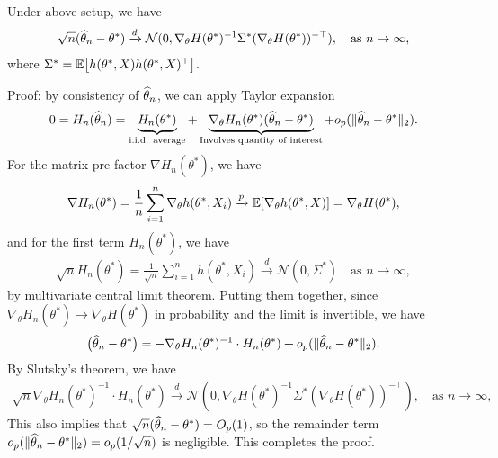 \documentclass[11pt,letterpaper]{article}
\numberwithin{assumption}{lecture}
\numberwithin{theorem}{lecture}
\numberwithin{proposition}{lecture}
\numberwithin{lemma}{lecture}
\numberwithin{claim}{lecture}
\numberwithin{corollary}{lecture}
\numberwithin{definition}{lecture}
\numberwithin{conjecture}{lecture}
\numberwithin{remark}{lecture}
\numberwithin{example}{lecture}
\numberwithin{equation}{lecture}
\begin{document}
\begin{theorem}
  Under above setup, we have
  \begin{align*}
    \sqrt{n} (\widehat{\theta}_n - \theta^*) \xrightarrow{d} \mathcal{N} (0, \nabla_\theta H (\theta^*)^{-1} \Sigma^* (\nabla_\theta H (\theta^*))^{- \top}), \quad \text{as } n \to \infty,
  \end{align*}
  where $\Sigma^* = {\mathbb{E}} \big[ h(\theta^*, X) h(\theta^*, X)^\top \big]$.
\end{theorem}
Proof: by consistency of $\widehat{\theta}_n$, we can apply Taylor expansion
\begin{align*}
  0 = H_n (\widehat{\theta}_n) = \underbrace{H_n (\theta^*)}_{\text{i.i.d. average}} + \underbrace{\nabla_\theta H_n (\theta^*) (\widehat{\theta}_n - \theta^*)}_{\text{Involves quantity of interest}} + o_p (\|\widehat{\theta}_n - \theta^*\|_2).
\end{align*}
For the matrix pre-factor $\nabla H_n (\theta^*)$, we have
\begin{align*}
  \nabla H_n (\theta^*) = \frac{1}{n} \sum_{i=1}^n \nabla_\theta h(\theta^*, X_i) \xrightarrow{p} {\mathbb{E}} [\nabla_\theta h(\theta^*, X)] = \nabla_\theta H (\theta^*),
\end{align*}
and for the first term $H_n (\theta^*)$, we have
\begin{align*}
  \sqrt{n} H_n (\theta^*) = \frac{1}{\sqrt{n}} \sum_{i=1}^n h(\theta^*, X_i) \xrightarrow{d} \mathcal{N} (0, \Sigma^*) \quad \text{as } n \to \infty,
\end{align*}
by multivariate central limit theorem. Putting them together, since $\nabla_\theta H_n (\theta^*) \to \nabla_\theta H (\theta^*)$ in probability and the limit is invertible, we have
\begin{align*}
  \big(\widehat{\theta}_n - \theta^* \big) = - \nabla_\theta H_n (\theta^*)^{-1} \cdot  H_n (\theta^*) + o_p (\|\widehat{\theta}_n - \theta^*\|_2).
\end{align*}
By Slutsky's theorem, we have
\begin{align*}
  \sqrt{n} \nabla_\theta H_n (\theta^*)^{-1} \cdot  H_n (\theta^*)  \xrightarrow{d} \mathcal{N} (0, \nabla_\theta H (\theta^*)^{-1} \Sigma^* (\nabla_\theta H (\theta^*))^{- \top}), \quad \text{as } n \to \infty,
\end{align*}
This also implies that $\sqrt{n} (\widehat{\theta}_n - \theta^*) = O_p (1)$, so the remainder term $o_p (\|\widehat{\theta}_n - \theta^*\|_2) = o_p (1/\sqrt{n})$ is negligible. This completes the proof.
\end{document}
